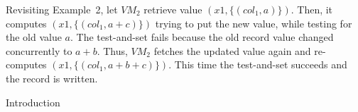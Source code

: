 Revisiting Example~2, let $VM_2$ retrieve value $(x1, \{(col_1,
a)\})$. Then, it computes $(x1,\{(col_1,a+c)\})$ trying to put the new
value, while testing for the old value $a$. The test-and-set fails
because the old record value changed concurrently to $a+b$. Thus,
$VM_2$ fetches the updated value again and re-computes
$(x1,\{(col_1,a+b+c)\})$. This time the test-and-set succeeds and the
record is written.


Introduction














